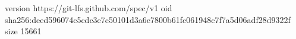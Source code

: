 version https://git-lfs.github.com/spec/v1
oid sha256:deed596074c5cdc3e7c50101d3a6e7800b61fc061948c7f7a5d06adf28d9322f
size 15661
